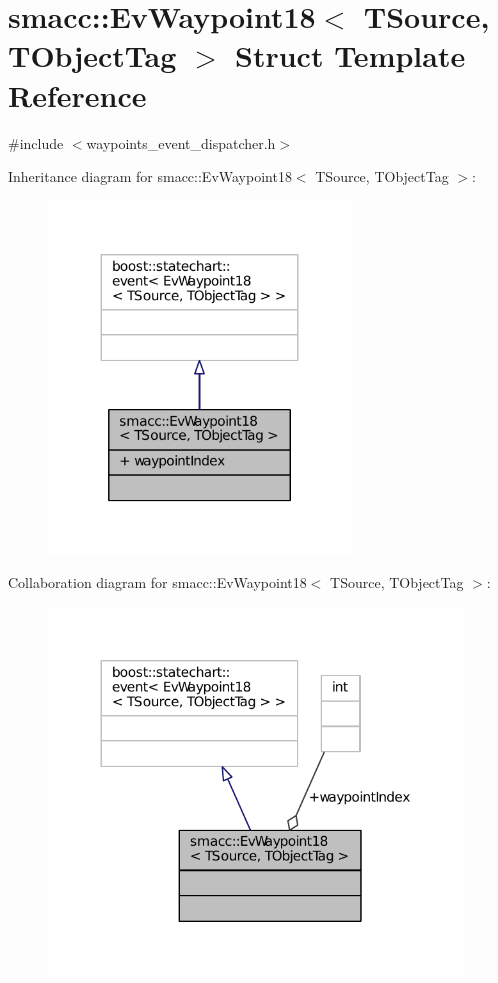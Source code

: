 \hypertarget{structsmacc_1_1EvWaypoint18}{}\section{smacc\+:\+:Ev\+Waypoint18$<$ T\+Source, T\+Object\+Tag $>$ Struct Template Reference}
\label{structsmacc_1_1EvWaypoint18}


{\ttfamily \#include $<$waypoints\+\_\+event\+\_\+dispatcher.\+h$>$}



Inheritance diagram for smacc\+:\+:Ev\+Waypoint18$<$ T\+Source, T\+Object\+Tag $>$\+:
\nopagebreak
\begin{figure}[H]
\begin{center}
\leavevmode
\includegraphics[width=227pt]{structsmacc_1_1EvWaypoint18__inherit__graph}
\end{center}
\end{figure}


Collaboration diagram for smacc\+:\+:Ev\+Waypoint18$<$ T\+Source, T\+Object\+Tag $>$\+:
\nopagebreak
\begin{figure}[H]
\begin{center}
\leavevmode
\includegraphics[width=312pt]{structsmacc_1_1EvWaypoint18__coll__graph}
\end{center}
\end{figure}
